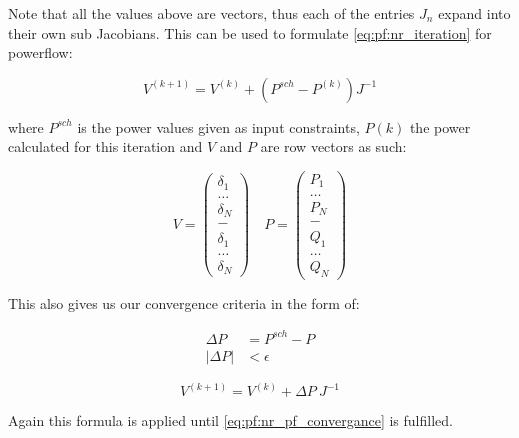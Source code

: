 Note that all the values above are vectors, thus each of the entries $J_n$ expand into
their own sub Jacobians.
This can be used to formulate \ref{eq:pf:nr_iteration} for powerflow:

\begin{equation}
    V^{(k+1)} = V^{(k)} + (P^{sch} - P^{(k)})J^{-1}
\end{equation}

where $P^{sch}$ is the power values given as input constraints, $P(k)$ the power
calculated for this iteration and $V$ and $P$ are row vectors as such:

\begin{equation}
    V = 
    \begin{pmatrix}
        \delta_1\\
        \dots\\
        \delta_N\\
        -\\
        \delta_1\\
        \dots\\
        \delta_N
    \end{pmatrix}
    \quad
    P = 
    \begin{pmatrix}
        P_1\\
        \dots\\
        P_N\\
        -\\
        Q_1\\
        \dots\\
        Q_N
    \end{pmatrix}
\end{equation}

This also gives us our convergence criteria in the form of:

\begin{align}
    \Delta P &= P^{sch} - P\\
    |\Delta P| &< \epsilon
    \label{eq:pf:nr_pf_convergance}
\end{align}

\begin{equation}
    V^{(k+1)} = V^{(k)} + \Delta P \ J^{-1}
    \label{eq:pf:nr_pf}
\end{equation}

Again this formula is applied until \ref{eq:pf:nr_pf_convergance} is fulfilled.


